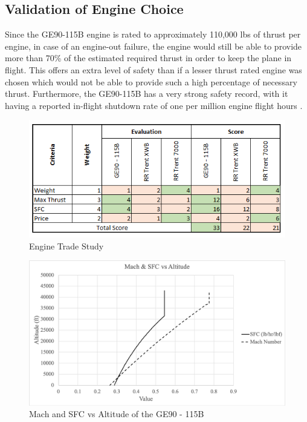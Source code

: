 \subsection{Validation of Engine Choice}

Since the GE90-115B engine is rated to approximately 110,000 lbs of thrust per engine, in case of an engine-out failure, the engine would still be able to provide more than 70\% of the estimated required thrust in order to keep the plane in flight. This offers an extra level of safety than if a lesser thrust rated engine was chosen which would not be able to provide such a high percentage of necessary thrust. Furthermore, the GE90-115B has a very strong safety record, with it having a reported in-flight shutdown rate of one per million engine flight hours \cite{geifsd}. 

\begin{figure} [h!]
    \centering
    \includegraphics[width=\textwidth]{Photos/GE90Trade.PNG}
    \caption{Engine Trade Study}
    \label{fig:enginetrade}
\end{figure}

\begin{figure} [h!]
    \centering
    \includegraphics[width=\textwidth]{Photos/propulsion/mach.png}
    \caption{Mach and SFC vs Altitude of the GE90 - 115B}
    \label{fig:machvssfc}
\end{figure}

